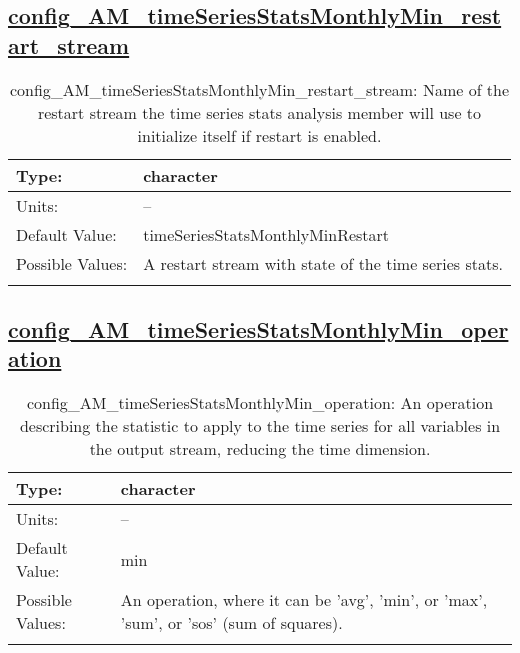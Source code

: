 \subsection[config\_AM\_timeSeriesStatsMonthlyMin\_restart\_stream]{\hyperref[sec:nm_tab_AM_timeSeriesStatsMonthlyMin]{config\_AM\_timeSeriesStatsMonthlyMin\_restart\_stream}}
\label{subsec:nm_sec_config_AM_timeSeriesStatsMonthlyMin_restart_stream}
\begin{center}
\begin{longtable}{| p{2.0in} || p{4.0in} |}
    \hline
    Type: & character \\
    \hline
    Units: & -- \\
    \hline
    Default Value: & timeSeriesStatsMonthlyMinRestart \\
    \hline
    Possible Values: & A restart stream with state of the time series stats. \\
    \hline
    \caption{config\_AM\_timeSeriesStatsMonthlyMin\_restart\_stream: Name of the restart stream the time series stats analysis member will use to initialize itself if restart is enabled.}
\end{longtable}
\end{center}
\subsection[config\_AM\_timeSeriesStatsMonthlyMin\_operation]{\hyperref[sec:nm_tab_AM_timeSeriesStatsMonthlyMin]{config\_AM\_timeSeriesStatsMonthlyMin\_operation}}
\label{subsec:nm_sec_config_AM_timeSeriesStatsMonthlyMin_operation}
\begin{center}
\begin{longtable}{| p{2.0in} || p{4.0in} |}
    \hline
    Type: & character \\
    \hline
    Units: & -- \\
    \hline
    Default Value: & min \\
    \hline
    Possible Values: & An operation, where it can be 'avg', 'min', or 'max', 'sum', or 'sos' (sum of squares). \\
    \hline
    \caption{config\_AM\_timeSeriesStatsMonthlyMin\_operation: An operation describing the statistic to apply to the time series for all variables in the output stream, reducing the time dimension.}
\end{longtable}
\end{center}
